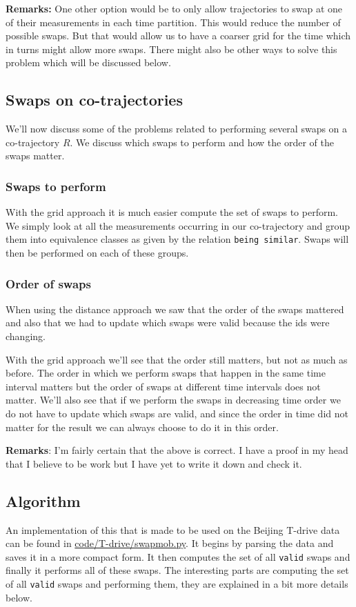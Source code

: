 \documentclass[11pt]{article}
\begin{document}
\textbf{Remarks:} One other option would be to only allow trajectories to
 swap at one of their measurements in each time partition. This would
 reduce the number of possible swaps. But that would allow us to have
 a coarser grid for the time which in turns might allow more swaps.
 There might also be other ways to solve this problem which will be
 discussed below.
\subsection{Swaps on co-trajectories}
\label{sec:orgba9b89f}
We'll now discuss some of the problems related to performing several
swaps on a co-trajectory \(R\). We discuss which swaps to perform and
how the order of the swaps matter.
\subsubsection{Swaps to perform}
\label{sec:org08f57cc}
With the grid approach it is much easier compute the set of swaps to
perform. We simply look at all the measurements occurring in our
co-trajectory and group them into equivalence classes as given by the
relation \texttt{being similar}. Swaps will then be performed on each of
these groups.
\subsubsection{Order of swaps}
\label{sec:org6596eec}
When using the distance approach we saw that the order of the swaps
mattered and also that we had to update which swaps were valid because
the ids were changing.

With the grid approach we'll see that the order still matters, but not
as much as before. The order in which we perform swaps that happen in
the same time interval matters but the order of swaps at different
time intervals does not matter. We'll also see that if we perform the
swaps in decreasing time order we do not have to update which swaps
are valid, and since the order in time did not matter for the result
we can always choose to do it in this order.

\textbf{Remarks}: I'm fairly certain that the above is correct. I have a
 proof in my head that I believe to be work but I have yet to write
 it down and check it.
\subsection{Algorithm}
\label{sec:org587b4bb}
An implementation of this that is made to be used on the Beijing
T-drive data can be found in \url{code/T-drive/swapmob.py}. It begins
by parsing the data and saves it in a more compact form. It then
computes the set of all \texttt{valid} swaps and finally it performs all of
these swaps. The interesting parts are computing the set of all
\texttt{valid} swaps and performing them, they are explained in a bit more
details below.
\end{document}
